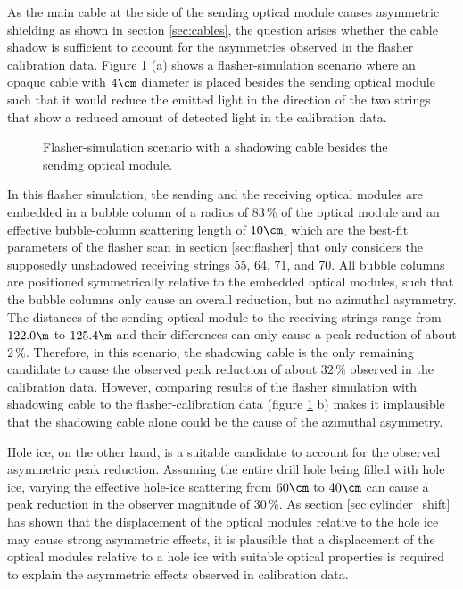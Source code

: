 As the main cable at the side of the sending optical module causes asymmetric shielding as shown in section \ref{sec:cables}, the question arises whether the cable shadow is sufficient to account for the asymmetries observed in the flasher calibration data. Figure \ref{fig:neen7Noo} (a) shows a flasher-simulation scenario where an opaque cable with $4\cm$ diameter is placed besides the sending optical module such that it would reduce the emitted light in the direction of the two strings that show a reduced amount of detected light in the calibration data.

\begin{figure}[htbp]
  \hfill
  \caption{Flasher-simulation scenario with a shadowing cable besides the sending optical module.}
  \label{fig:neen7Noo}
\end{figure}


In this flasher simulation, the sending and the receiving optical modules are embedded in a bubble column of a radius of $83\,\%$ of the optical module and an effective bubble-column scattering length of $10\cm$, which are the best-fit parameters of the flasher scan in section \ref{sec:flasher} that only considers the supposedly unshadowed receiving strings 55, 64, 71, and 70. All bubble columns are positioned symmetrically relative to the embedded optical modules, such that the bubble columns only cause an overall reduction, but no azimuthal asymmetry. The distances of the sending optical module to the receiving strings range from $122.0\m$ to $125.4\m$ and their differences can only cause a peak reduction of about $2\,\%$.
Therefore, in this scenario, the shadowing cable is the only remaining candidate to cause the observed peak reduction of about $32\,\%$ observed in the calibration data.
However, comparing results of the flasher simulation with shadowing cable to the flasher-calibration data (figure \ref{fig:neen7Noo} b) makes it implausible that the shadowing cable alone could be the cause of the azimuthal asymmetry.

Hole ice, on the other hand, is a suitable candidate to account for the observed asymmetric peak reduction. Assuming the entire drill hole being filled with hole ice, varying the effective hole-ice scattering from $60\cm$ to $40\cm$ can cause a peak reduction in the observer magnitude of $30\,\%$. As section \ref{sec:cylinder_shift} has shown that the displacement of the optical modules relative to the hole ice may cause strong asymmetric effects, it is plausible that a displacement of the optical modules relative to a hole ice with suitable optical properties is required to explain the asymmetric effects observed in calibration data.
